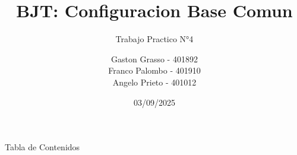 \documentclass{beamer}
\title{BJT: Configuracion Base Comun}
\subtitle{Trabajo Practico N°4}
\author[Grasso, Palombo, Prieto]{
                                  Gaston Grasso - 401892\\
                                  Franco Palombo - 401910\\
                                  Angelo Prieto - 401012}
\institute[UTN - FRC]{Universidad Tecnologica Nacional, Facultad Regional Cordoba}
\date[2025]{03/09/2025}
\begin{document}
\frame{\titlepage}
\begin{frame}{Tabla de Contenidos}
\tableofcontents
\end{frame}





\end{document}
